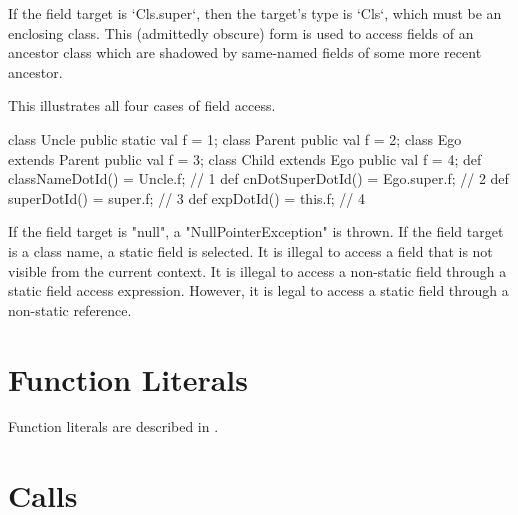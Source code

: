 If the field target is \xcd`Cls.super`, then the target's type is \xcd`Cls`,
which must be an  enclosing class.  This (admittedly
obscure) form is used to access fields of an ancestor class which are shadowed
by same-named fields of some more recent ancestor.  

\begin{ex}
This illustrates all four cases of field access.
\begin{xten}
class Uncle {
  public static val f = 1;
}
class Parent {
  public val f = 2;
}
class Ego extends Parent {
  public val f = 3;
  class Child extends Ego {
     public val f = 4;
     def classNameDotId() =  Uncle.f;     // 1
     def cnDotSuperDotId() = Ego.super.f; // 2
     def superDotId() =      super.f;     // 3
     def expDotId() =        this.f;      // 4
  }
}
\end{xten}
%
\end{ex}

If the field target is \xcd"null", a \xcd"NullPointerException"
is thrown.
If the field target is a class name, a static field is selected.
It is illegal to access  a field that is not visible from
the current context.
It is illegal to access a non-static field
through a static field access expression.  However, it is legal to access a
static field through a non-static reference.

\section{Function Literals}
Function literals are described in .

\section{Calls}
\label{Call}
\label{MethodInvocation}
\label{MethodInvocationSubstitution}

